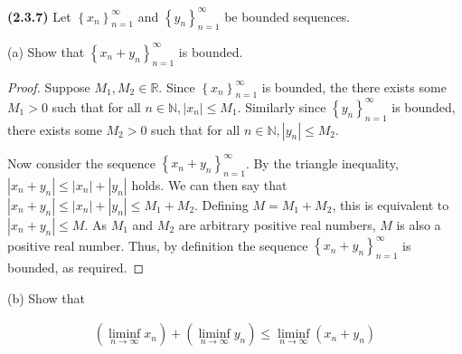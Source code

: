 \documentclass[12pt]{article}
\newcommand{\liminftoinf}[1][n]{\liminf_{ {#1} \to \infty}}
\newcommand{\abs}[1]{\left| {#1} \right|}
\newcommand{\seq}[2][n]{\left\{ {#2} \right\}_{#1=1}^\infty}
\newcommand{\paren}[1]{\left( {#1} \right)}
\newcommand{\bR}{\mathbb{R}}
\newcommand{\bN}{\mathbb{N}}
\begin{document}
\pagestyle{fancy}
\setlength{\headheight}{14.49998pt}
\fancyfoot[C]{\thepage}

\noindent \textbf{(2.3.7)} Let $\seq{x_n}$ and $\seq{y_n}$ be bounded sequences.

(a) Show that $\seq{x_n+y_n}$ is bounded.

\begin{proof}
	Suppose $M_1,M_2\in\bR$. Since $\seq{x_n}$ is bounded, the there exists some $M_1>0$ such that for all $n\in\bN, \abs{x_n}\le M_1$. Similarly since $\seq{y_n}$ is bounded, there exists some $M_2>0$ such that for all $n\in\bN, \abs{y_n}\le M_2$. 
	
	\indent Now consider the sequence $\seq{x_n + y_n}$. By the triangle inequality, $\abs{x_n+y_n}\le\abs{x_n}+\abs{y_n}$ holds. We can then say that $\abs{x_n+y_n}\le\abs{x_n}+\abs{y_n}\le M_1+M_2$. Defining $M=M_1+M_2$, this is equivalent to $\abs{x_n+y_n}\le M$. As $M_1$ and $M_2$ are arbitrary positive real numbers, $M$ is also a positive real number. Thus, by definition the sequence $\seq{x_n+y_n}$ is bounded, as required.
\end{proof}

(b) Show that

\begin{align*}
	\paren{\liminftoinf x_n}+\paren{\liminftoinf y_n}\le\liminftoinf\paren{x_n+y_n}
\end{align*}
\end{document}
